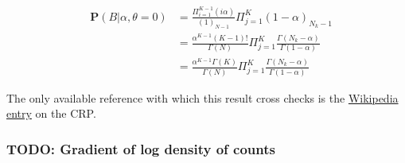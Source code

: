 \documentclass[12pt]{article}
\begin{document}
\begin{eqnarray*}
&\mathbf{P}(B|\alpha,\theta=0)
    & = \frac{\Pi_{i=1}^{K-1}(i\alpha)}{(1)_{N-1}}\Pi_{j=1}^K(1-\alpha)_{N_k-1}\\
&   & = \frac{\alpha^{K-1}(K-1)!}{\Gamma(N)}\Pi_{j=1}^K
            \frac{\Gamma(N_k-\alpha)}{\Gamma(1-\alpha)}\\
&   & = \frac{\alpha^{K-1}\Gamma(K)}{\Gamma(N)}\Pi_{j=1}^K
\frac{\Gamma(N_k-\alpha)}{\Gamma(1-\alpha)}
\end{eqnarray*}

The only available reference with which this result cross checks is the
\href{https://en.wikipedia.org/wiki/Chinese_restaurant_process#Generalization}
{Wikipedia entry} on the CRP.

\subsubsection{TODO: Gradient of log density of counts}
\end{document}
